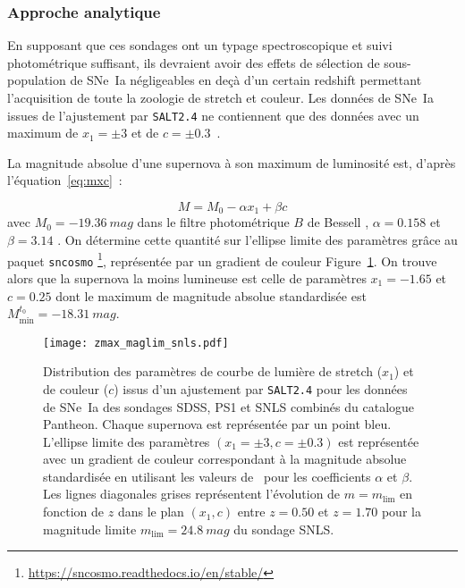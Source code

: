 \documentclass[../main/main.tex]{subfiles}
\begin{document}
\subsubsection{Approche analytique}\label{sssec:maglim}

En supposant que ces sondages ont un typage spectroscopique et suivi
photométrique suffisant, ils devraient avoir des effets de sélection de
sous-population de SNe~Ia négligeables en deçà d'un certain redshift permettant
l'acquisition de toute la zoologie de stretch et couleur. Les données de SNe~Ia
issues de l'ajustement par \texttt{SALT2.4} ne contiennent que des données avec
un maximum de $x_1 = \pm 3$ et de $c = \pm 0.3$~\citep[][cf
Section~\ref{ssec:salt}]{guy2007, betoule2014}.

La magnitude absolue d'une supernova à son maximum de luminosité est, d'après
l'équation~\ref{eq:mxc}~:

\begin{equation*}
    M = M_0 -\alpha x_1 + \beta c
\end{equation*}
avec $M_0 = \SI{-19.36}{mag}$ dans le filtre photométrique $B$ de Bessell
\citep{kessler2009a, scolnic2014}, $\alpha=0.158$ et $\beta=3.14$
\citep[Table 7,][]{scolnic2018}. On détermine cette quantité sur l'ellipse limite
des paramètres grâce au paquet \texttt{sncosmo}
\footnote{\href{https://sncosmo.readthedocs.io/en/stable/}
{https://sncosmo.readthedocs.io/en/stable/}}, représentée par un gradient de
couleur Figure~\ref{fig:maglim}. On trouve alors que la supernova la moins
lumineuse est celle de paramètres $x_1 = -1.65$ et $c = 0.25$ dont le maximum de
magnitude absolue standardisée est $M_{\min}^{t_0}=\SI{-18.31}{mag}$.

\begin{figure}
    \centering
    \texttt{[image: zmax\_maglim\_snls.pdf]}
    \caption[Distribution et limite des paramètres de courbe de lumière de
    stretch ($x_1$) et de couleur ($c$) des sondages SDSS, PS1 et SNLS combinés
    du catalogue Pantheon.]{Distribution des paramètres de courbe de lumière de
        stretch ($x_1$) et de couleur ($c$) issus d'un ajustement par
        \texttt{SALT2.4} pour les données de SNe~Ia des sondages SDSS, PS1 et
        SNLS combinés du catalogue Pantheon. Chaque supernova est représentée
        par un point bleu. L'ellipse limite des paramètres $(x_1=\pm3,
        c=\pm0.3)$ est représentée avec un gradient de couleur correspondant à
        la magnitude absolue standardisée en utilisant les valeurs
        de~\cite{scolnic2018} pour les coefficients $\alpha$ et $\beta$. Les
        lignes diagonales grises représentent l'évolution de $m = m_{\lim}$ en
        fonction de $z$ dans le plan $(x_1,c)$ entre $z=0.50$ et $z=1.70$ pour
    la magnitude limite $m_{\lim}=\SI{24.8}{mag}$ du sondage SNLS.}
    \label{fig:maglim}
\end{figure}
\end{document}
